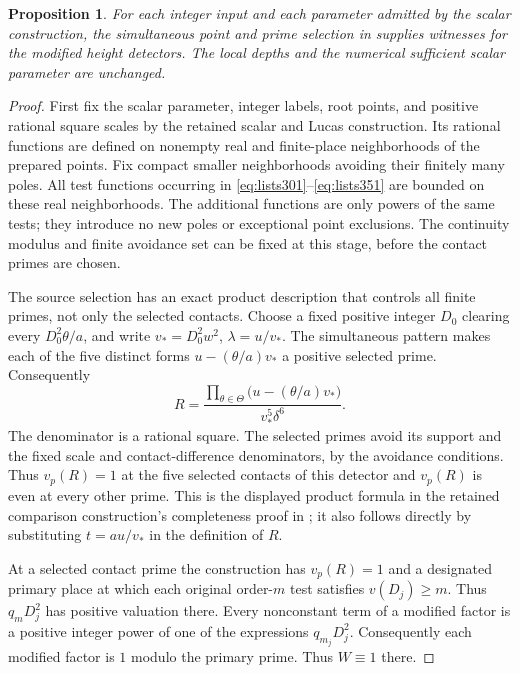 \documentclass[11pt,a4paper]{article}
\newtheorem{proposition}[theorem]{Proposition}
\theoremstyle{remark}\newtheorem{remark}[theorem]{Remark}
\begin{document}
\begin{proposition}\label{prop:complete}
For each integer input and each parameter admitted by the scalar
construction, the simultaneous point and prime selection in
\cite{Explicit370,Family317} supplies witnesses for the modified
height detectors. The local depths and the numerical sufficient scalar
parameter are unchanged.
\end{proposition}
\begin{proof}
First fix the scalar parameter, integer labels, root points, and positive
rational square scales by the retained scalar and Lucas construction.
Its rational functions are defined on nonempty real and finite-place
neighborhoods of the prepared points. Fix compact smaller neighborhoods
avoiding their finitely many poles. All test functions occurring in
\eqref{eq:lists301}--\eqref{eq:lists351} are bounded on these real neighborhoods.
The additional functions are only powers of the same tests; they
introduce no new poles or exceptional point exclusions. The continuity
modulus and finite avoidance set can be fixed at this stage, before the
contact primes are chosen.

The source selection has an exact product description that controls
all finite primes, not only the selected contacts. Choose a fixed
positive integer $D_0$ clearing every $D_0^2\theta/a$, and write
$v_*=D_0^2w^2$, $\lambda=u/v_*$. The simultaneous pattern makes each
of the five distinct forms $u-(\theta/a)v_*$ a positive selected
prime. Consequently
\begin{equation}\label{eq:prime-product}
 R=\frac{\displaystyle\prod_{\theta\in\Theta}
                 \bigl(u-(\theta/a)v_*\bigr)}{v_*^5\delta^6}.
\end{equation}
The denominator is a rational square. The selected primes avoid its
support and the fixed scale and contact-difference denominators, by
the avoidance conditions. Thus $v_p(R)=1$ at the five selected
contacts of this detector and $v_p(R)$ is even at every other prime.
This is the displayed product formula in the retained comparison
construction's completeness proof in \cite{Glazer}; it also follows
directly by substituting $t=a u/v_*$ in the definition of $R$.

At a selected contact prime the construction has $v_p(R)=1$ and a
designated primary place at which each original order-$m$ test satisfies
$v(D_j)\ge m$. Thus $q_mD_j^2$ has positive valuation there.
Every nonconstant term of a modified factor is a positive
integer power of one of the expressions $q_{m_j}D_j^2$.
Consequently each modified factor is $1$ modulo the primary prime.
Thus $W\equiv1$ there.


\end{proof}
\end{document}
